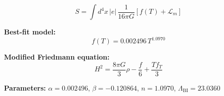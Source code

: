 
\begin{equation}
  S = \int d^4x \, |e| \, \frac{1}{16\pi G} \left[ f(T) + \mathcal{L}_m \right]
\end{equation}

\textbf{Best-fit model:}
\begin{equation}
  f(T) = 0.002496 \, T^{1.0970}
\end{equation}

\textbf{Modified Friedmann equation:}
\begin{equation}
  H^2 = \frac{8\pi G}{3} \rho - \frac{f}{6} + \frac{T f_T}{3}
\end{equation}

\textbf{Parameters:}
$\alpha = 0.002496$, \quad
$\beta = -0.120864$, \quad
$n = 1.0970$, \quad
$\Lambda_{\text{BI}} = 23.0360$